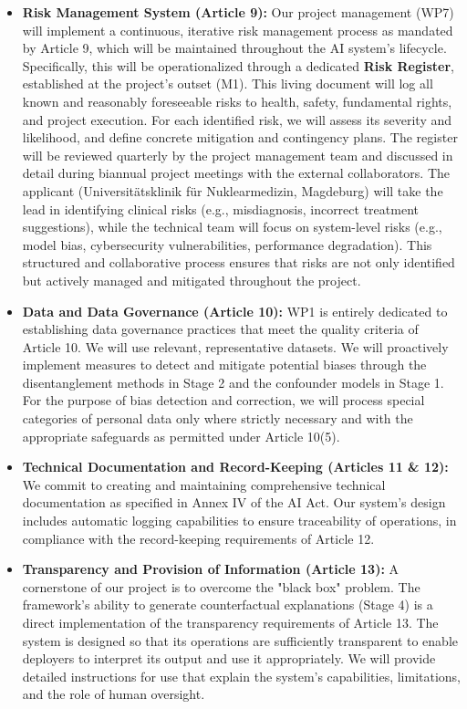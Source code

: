 \documentclass[11pt, a4paper]{article}
\begin{document}
\begin{itemize}
    \item \textbf{Risk Management System (Article 9):} Our project management (WP7) will implement a continuous, iterative risk management process as mandated by Article 9, which will be maintained throughout the AI system’s lifecycle. Specifically, this will be operationalized through a dedicated \textbf{Risk Register}, established at the project's outset (M1). This living document will log all known and reasonably foreseeable risks to health, safety, fundamental rights, and project execution. For each identified risk, we will assess its severity and likelihood, and define concrete mitigation and contingency plans. The register will be reviewed quarterly by the project management team and discussed in detail during biannual project meetings with the external collaborators. The applicant (Universitätsklinik für Nuklearmedizin, Magdeburg) will take the lead in identifying clinical risks (e.g., misdiagnosis, incorrect treatment suggestions), while the technical team will focus on system-level risks (e.g., model bias, cybersecurity vulnerabilities, performance degradation). This structured and collaborative process ensures that risks are not only identified but actively managed and mitigated throughout the project.

    \item \textbf{Data and Data Governance (Article 10):} WP1 is entirely dedicated to establishing data governance practices that meet the quality criteria of Article 10. We will use relevant, representative datasets. We will proactively implement measures to detect and mitigate potential biases through the disentanglement methods in Stage 2 and the confounder models in Stage 1. For the purpose of bias detection and correction, we will process special categories of personal data only where strictly necessary and with the appropriate safeguards as permitted under Article 10(5).

    \item \textbf{Technical Documentation and Record-Keeping (Articles 11 \& 12):} We commit to creating and maintaining comprehensive technical documentation as specified in Annex IV of the AI Act. Our system's design includes automatic logging capabilities to ensure traceability of operations, in compliance with the record-keeping requirements of Article 12.

    \item \textbf{Transparency and Provision of Information (Article 13):} A cornerstone of our project is to overcome the "black box" problem. The framework's ability to generate counterfactual explanations (Stage 4) is a direct implementation of the transparency requirements of Article 13. The system is designed so that its operations are sufficiently transparent to enable deployers to interpret its output and use it appropriately. We will provide detailed instructions for use that explain the system's capabilities, limitations, and the role of human oversight.


\end{itemize}
\end{document}
